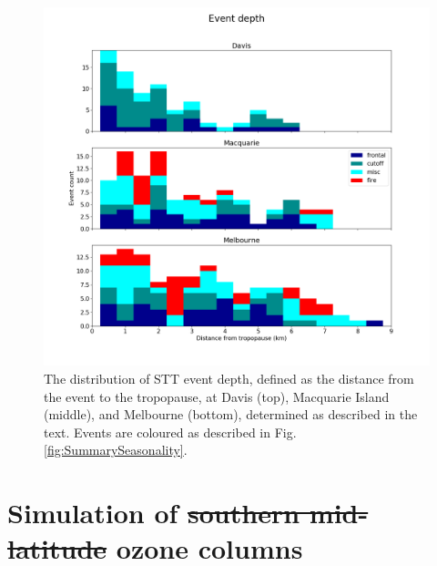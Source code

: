 \documentclass[acp, manuscript]{copernicus} %
\providecommand{\DIFdel}[1]{{\protect\color{red}\sout{#1}}}                      %
\providecommand{\DIFdelbegin}{} %
\providecommand{\DIFdelend}{} %
\begin{document}
  \begin{figure}[t]
    \includegraphics[width=12cm]{figures/summary_depth.png}
    \caption{The distribution of STT event depth, defined as the distance from the event to the tropopause, at Davis (top), Macquarie Island (middle), and Melbourne (bottom), determined as described in the text.
    Events are coloured as described in Fig. \ref{fig:SummarySeasonality}.}
    \label{fig:SummaryTPDepths}    
  \end{figure}

\section{Simulation of \DIFdelbegin \DIFdel{southern mid-latitude }\DIFdelend ozone columns}
  \DIFdelbegin %
\end{document}
